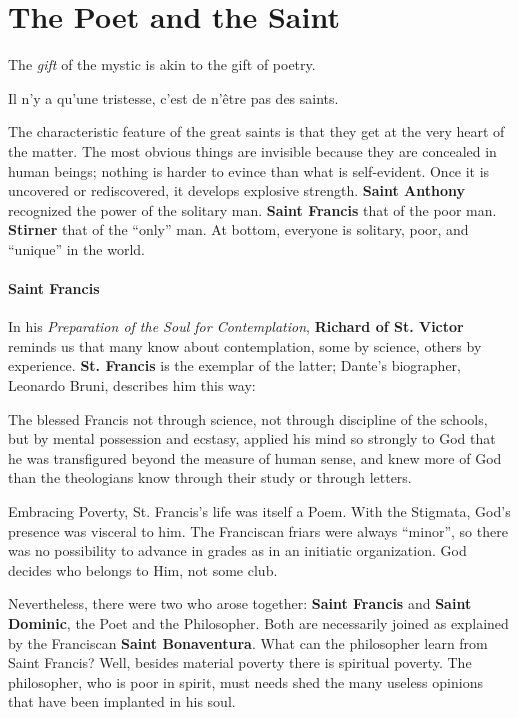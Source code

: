 \section{The Poet and the Saint}

\begin{quotex}
The \emph{gift} of the mystic is akin to the gift of poetry.

Il n'y a qu'une tristesse, c'est de n'être pas des saints.

The characteristic feature of the great saints is that they get at the very heart of the matter. The most obvious things are invisible because they are concealed in human beings; nothing is harder to evince than what is self-evident. Once it is uncovered or rediscovered, it develops explosive strength. \textbf{Saint Anthony} recognized the power of the solitary man. \textbf{Saint Francis} that of the poor man. \textbf{Stirner} that of the ``only'' man. At bottom, everyone is solitary, poor, and ``unique'' in the world.
\end{quotex}


\paragraph{Saint Francis}


In his \emph{Preparation of the Soul for Contemplation}, \textbf{Richard of St. Victor} reminds us that many know about contemplation, some by science, others by experience. \textbf{St. Francis} is the exemplar of the latter; Dante's biographer, Leonardo Bruni, describes him this way:

\begin{quotex}
The blessed Francis not through science, not through discipline of the schools, but by mental possession and ecstasy, applied his mind so strongly to God that he was transfigured beyond the measure of human sense, and knew more of God than the theologians know through their study or through letters.
\end{quotex}


Embracing Poverty, St. Francis's life was itself a Poem. With the Stigmata, God's presence was visceral to him. The Franciscan friars were always ``minor'', so there was no possibility to advance in grades as in an initiatic organization. God decides who belongs to Him, not some club.

Nevertheless, there were two who arose together: \textbf{Saint Francis} and \textbf{Saint Dominic}, the Poet and the Philosopher. Both are necessarily joined as explained by the Franciscan \textbf{Saint Bonaventura}. What can the philosopher learn from Saint Francis? Well, besides material poverty there is spiritual poverty. The philosopher, who is poor in spirit, must needs shed the many useless opinions that have been implanted in his soul.

